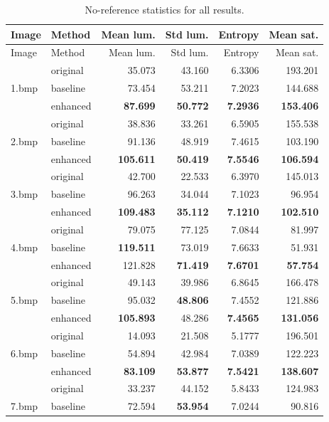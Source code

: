 \documentclass[11pt,a4paper]{article}
\begin{document}
\scriptsize
\begin{longtable}{llrrrr}
\caption{No-reference statistics for all results.}
\label{tab:metrics}\\
\toprule
Image & Method & Mean lum. & Std lum. & Entropy & Mean sat. \\
\midrule
\endfirsthead
\toprule
Image & Method & Mean lum. & Std lum. & Entropy & Mean sat. \\
\midrule
\endhead
 & original & 35.073 & 43.160 & 6.3306 & 193.201 \\
1.bmp & baseline & 73.454 & 53.211 & 7.2023 & 144.688 \\
 & enhanced & \textbf{87.699} & \textbf{50.772} & \textbf{7.2936} & \textbf{153.406} \\
\midrule
 & original & 38.836 & 33.261 & 6.5905 & 155.538 \\
2.bmp & baseline & 91.136 & 48.919 & 7.4615 & 103.190 \\
 & enhanced & \textbf{105.611} & \textbf{50.419} & \textbf{7.5546} & \textbf{106.594} \\
\midrule
 & original & 42.700 & 22.533 & 6.3970 & 145.013 \\
3.bmp & baseline & 96.263 & 34.044 & 7.1023 & 96.954 \\
 & enhanced & \textbf{109.483} & \textbf{35.112} & \textbf{7.1210} & \textbf{102.510} \\
\midrule
 & original & 79.075 & 77.125 & 7.0844 & 81.997 \\
4.bmp & baseline & \textbf{119.511} & 73.019 & 7.6633 & 51.931 \\
 & enhanced & 121.828 & \textbf{71.419} & \textbf{7.6701} & \textbf{57.754} \\
\midrule
 & original & 49.143 & 39.986 & 6.8645 & 166.478 \\
5.bmp & baseline & 95.032 & \textbf{48.806} & 7.4552 & 121.886 \\
 & enhanced & \textbf{105.893} & 48.286 & \textbf{7.4565} & \textbf{131.056} \\
\midrule
 & original & 14.093 & 21.508 & 5.1777 & 196.501 \\
6.bmp & baseline & 54.894 & 42.984 & 7.0389 & 122.223 \\
 & enhanced & \textbf{83.109} & \textbf{53.877} & \textbf{7.5421} & \textbf{138.607} \\
\midrule
 & original & 33.237 & 44.152 & 5.8433 & 124.983 \\
7.bmp & baseline & 72.594 & \textbf{53.954} & 7.0244 & 90.816 \\

\end{longtable}
\end{document}
